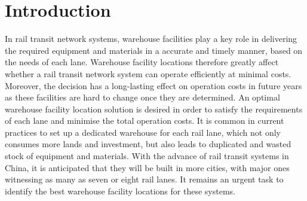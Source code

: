 \section{Introduction}
In rail transit network systems, warehouse facilities play a key role in delivering  the required equipment and materials in a accurate and timely manner, based on the needs of each lane.
Warehouse facility locations therefore greatly affect whether a rail transit network system can operate efficiently at minimal costs.
Moreover, the decision has a long-lasting effect on  operation costs in future years as these facilities are hard to change once they are determined.
An optimal warehouse facility location solution is desired in order to satisfy the requirements of each lane and minimise the total operation costs.
It is common in current practices to set up a dedicated warehouse for each rail lane, which not only consumes more lands and investment, but also leads to duplicated and wasted stock of equipment and materials.
With the advance of rail transit systems in China, it is anticipated that they will be built in more cities, with major ones witnessing as many as seven or eight rail lanes.
It remains an urgent task to identify the best warehouse facility locations for these systems.


